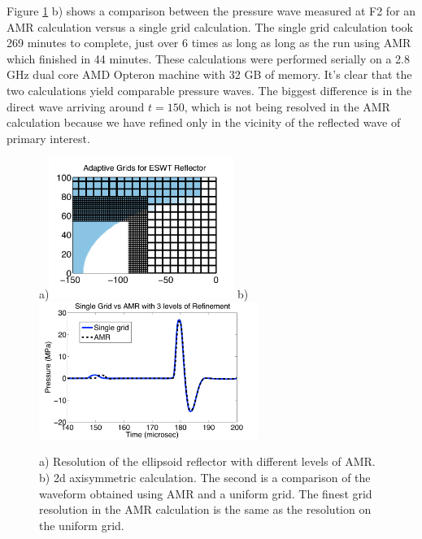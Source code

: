 \documentclass{article}
\begin{document}
Figure \ref{fig:amr_vs_singlegrid} b) shows a comparison between the pressure wave measured at F2 for an AMR calculation versus a single grid calculation.  The single grid calculation took 269 minutes to complete, just over 6 times as long as long as the run using AMR which finished in 44 minutes.  These calculations were performed serially on a 2.8 GHz dual core AMD Opteron machine with 32 GB of memory.  It's clear that the two calculations yield comparable pressure waves.  The biggest difference is in the direct wave arriving around $t=150$, which is not being resolved in the AMR calculation because we have refined only in the vicinity of the reflected wave of primary interest. 
\begin{figure}
\begin{center}
a)\includegraphics[height=1.8in]{amr_grid_ltblue.pdf}
b)\includegraphics[height=1.75in]{amr_vs_singlegrid.pdf}
\caption{ a) Resolution of the ellipsoid reflector with different levels of AMR.  b) 2d axisymmetric calculation.  The second is a comparison of the waveform obtained using AMR and a uniform grid.  The finest grid resolution in the AMR calculation is the same as the resolution on the uniform grid. }
\label{fig:amr_vs_singlegrid}
\end{center}
\end{figure}
\end{document}
